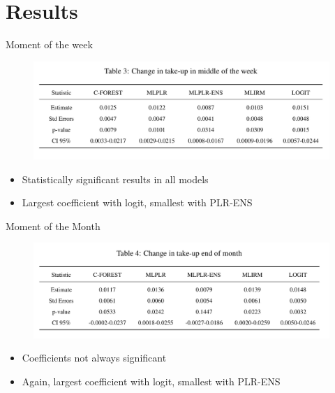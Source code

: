 \documentclass{beamer}
\begin{document}
\section{Results}

\begin{frame}{Moment of the week}
\begin{figure}[h!]
    \centering
    \includegraphics[width=1\textwidth]{ressources/tbl3.jpg}
\end{figure}

\begin{itemize}
\item Statistically significant results in all models
\item Largest coefficient with logit, smallest with PLR-ENS
\end{itemize}

\end{frame}

\begin{frame}{Moment of the Month}
\begin{figure}[h!]
    \centering
    \includegraphics[width=1\textwidth]{ressources/tbl4.jpg}
\end{figure}
\begin{itemize}
\item Coefficients not always significant
\item Again, largest coefficient with logit, smallest with PLR-ENS
\end{itemize}
\end{frame}
\end{document}
